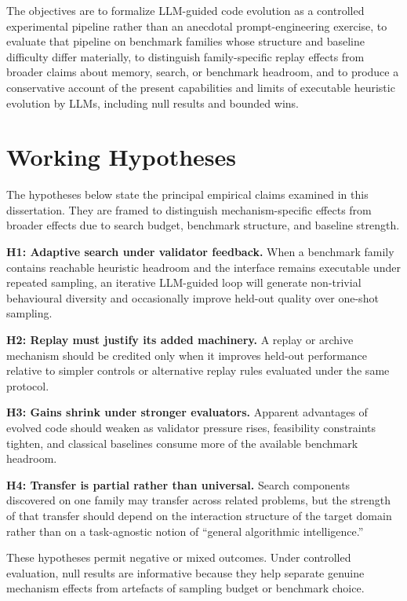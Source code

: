 The objectives are to formalize LLM-guided code evolution as a controlled experimental pipeline
rather than an anecdotal prompt-engineering exercise, to evaluate that pipeline on benchmark
families whose structure and baseline difficulty differ materially, to distinguish family-specific
replay effects from broader claims about memory, search, or benchmark headroom, and to produce a
conservative account of the present capabilities and limits of executable heuristic evolution by
LLMs, including null results and bounded wins.

\section{Working Hypotheses}
\label{sec:intro-hypotheses}

The hypotheses below state the principal empirical claims examined in this dissertation. They are
framed to distinguish mechanism-specific effects from broader effects due to search budget,
benchmark structure, and baseline strength.

\noindent\textbf{H1: Adaptive search under validator feedback.} When a benchmark family contains
reachable heuristic headroom and the interface remains executable under repeated sampling, an
iterative LLM-guided loop will generate non-trivial behavioural diversity and occasionally improve
held-out quality over one-shot sampling.

\noindent\textbf{H2: Replay must justify its added machinery.} A replay or archive mechanism
should be credited only when it improves held-out performance relative to simpler controls or
alternative replay rules evaluated under the same protocol.

\noindent\textbf{H3: Gains shrink under stronger evaluators.} Apparent advantages of evolved code
should weaken as validator pressure rises, feasibility constraints tighten, and classical baselines
consume more of the available benchmark headroom.

\noindent\textbf{H4: Transfer is partial rather than universal.} Search components discovered on
one family may transfer across related problems, but the strength of that transfer should depend on
the interaction structure of the target domain rather than on a task-agnostic notion of ``general
algorithmic intelligence.''

These hypotheses permit negative or mixed outcomes. Under controlled evaluation, null results are
informative because they help separate genuine mechanism effects from artefacts of sampling budget
or benchmark choice.

